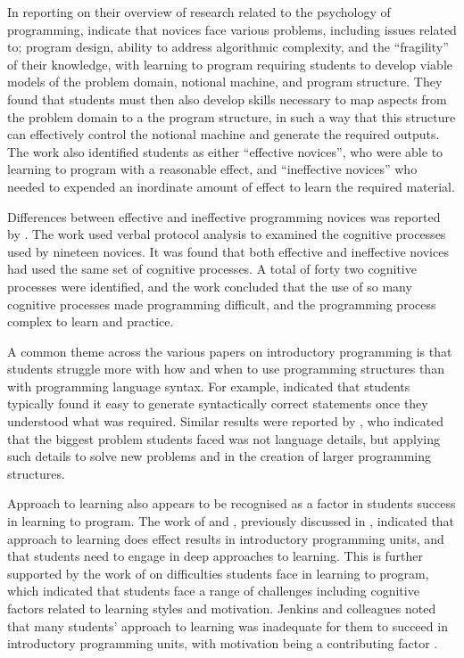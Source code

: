 In reporting on their overview of research related to the psychology of programming, \citet{Robins:2003} indicate that novices face various problems, including issues related to; program design, ability to address algorithmic complexity, and the ``fragility'' of their knowledge, with learning to program requiring students to develop viable models of the problem domain, notional machine, and program structure. They found that students must then also develop skills necessary to map aspects from the problem domain to a the program structure, in such a way that this structure can effectively control the notional machine and generate the required outputs. The work also identified students as either ``effective novices'', who were able to learning to program with a reasonable effect, and ``ineffective novices'' who needed to expended an inordinate amount of effect to learn the required material.

Differences between effective and ineffective programming novices was reported by \citet{Renumol:2010}. The work used verbal protocol analysis to examined the cognitive processes used by nineteen novices. It was found that both effective and ineffective novices had used the same set of cognitive processes. A total of forty two cognitive processes were identified, and the work concluded that the use of so many cognitive processes made programming difficult, and the programming process complex to learn and practice.

A common theme across the various papers on introductory programming is that students struggle more with how and when to use programming structures than with programming language syntax. For example, \citet{Winslow:1996} indicated that students typically found it easy to generate syntactically correct statements once they understood what was required. Similar results were reported by \citet{Lahtinen:2005}, who indicated that the biggest problem students faced was not language details, but applying such details to solve new problems and in the creation of larger programming structures. 

Approach to learning also appears to be recognised as a factor in students success in learning to program. The work of \citet{DeRaadt:2005} and \citet{Bruce:2003}, previously discussed in , indicated that approach to learning does effect results in introductory programming units, and that students need to engage in deep approaches to learning. This is further supported by the work of \citet{Jenkins:2002} on difficulties students face in learning to program, which indicated that students face a range of challenges including cognitive factors related to learning styles and motivation. Jenkins and colleagues noted that many students' approach to learning was inadequate for them to succeed in introductory programming units, with motivation being a contributing factor \cite{Jenkins:2001,Forte:2005}.

